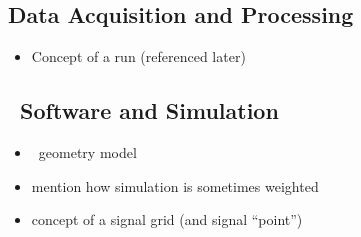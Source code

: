 \subsection{Data Acquisition and Processing}
\begin{itemize}
\item Concept of a run (referenced later)
\end{itemize}
\subsection{\atlas\ Software and Simulation}
\label{sec:software}
\begin{itemize}
\item \atlas\ geometry model
\item mention how simulation is sometimes weighted
\item concept of a signal grid (and signal ``point'')
\end{itemize}
